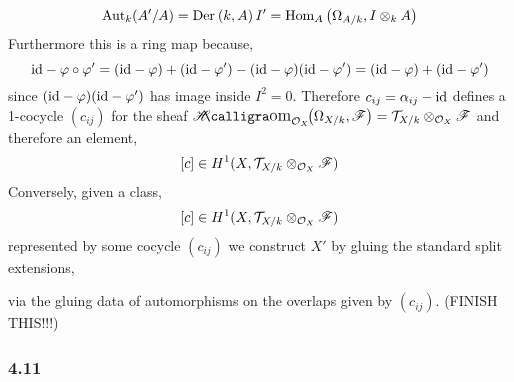 \documentclass[12pt]{article}
\begin{document}
\[ \mathrm{Aut}_k(A'/A) = \mathrm{Der}_{} \left( k, A \right){I'} = \mathrm{Hom}_{A} \left( \Omega_{A/k}, I \otimes_k A \right) \]
Furthermore this is a ring map because,
\[ \mathrm{id} - \varphi \circ \varphi' = (\mathrm{id} - \varphi) + (\mathrm{id} - \varphi') - (\mathrm{id} - \varphi)(\mathrm{id} - \varphi') = (\mathrm{id} - \varphi) + (\mathrm{id} - \varphi') \]
since $(\mathrm{id} - \varphi)(\mathrm{id} - \varphi')$ has image inside $I^2 = 0$.
Therefore $c_{ij} = \alpha_{ij} - \mathrm{id}$ defines a 1-cocycle $(c_{ij})$ for the sheaf $\shHom{\struct{X}}{\Omega_{X/k}}{\F} = \T_{X/k} \otimes_{\struct{X}} \F$ and therefore an element,
\[ [c] \in H^1(X, \mathcal{T}_{X/k} \otimes_{\mathcal{O}_{X}} \mathscr{F}) \]
Conversely, given a class,
\[ [c] \in H^1(X, \mathcal{T}_{X/k} \otimes_{\mathcal{O}_{X}} \mathscr{F}) \]
represented by some cocycle $(c_{ij})$ we construct $X'$ by gluing the standard split extensions,
\begin{center}
\end{center}
via the gluing data of automorphisms on the overlaps given by $(c_{ij})$.
(FINISH THIS!!!)

\subsubsection{4.11}
\end{document}
